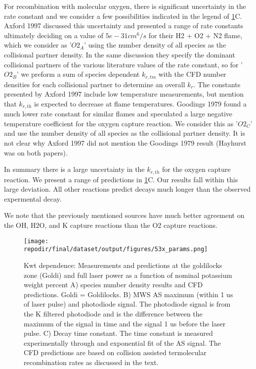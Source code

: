 For recombination with molecular oxygen, there is significant uncertainty in the rate constant and we consider a few possibilities indicated in the legend of \ref{fig:kwt_dependence}C. Axford 1997 discussed this uncertainty and presented a range of rate constants ultimately deciding on a value of $5e-31 cm^6/s$ for their H2 + O2 + N2 flame, which we consider as '$O2_A$' using the number density of all species as the collisional partner density. In the same discussion they specify the dominant collisional partners of the various literature values of the rate constant, so for '$O2_B$' we preform a sum of species dependent $k_{r,tm}$ with the CFD number densities for each collisional partner to determine an overall $k_r$. The constants presented by Axford 1997 include low temperature measurements, but mention that $k_{r,th}$ is expected to decrease at flame temperatures. Goodings 1979 found a much lower rate constant for similar flames and speculated a large negative temperature coefficient for the oxygen capture reaction. We consider this as '$O2_C$' and use the number density of all species as the collisional partner density. It is not clear why Axford 1997 did not mention the Goodings 1979 result (Hayhurst was on both papers). 

In summary there is a large uncertainty in the $k_{r,th}$ for the oxygen capture reaction. We present a range of predictions in \ref{fig:kwt_dependence}C. Our results fall within this large deviation. All other reactions predict decays much longer than the observed expermental decay. 

We note that the previously mentioned sources have much better agreement on the OH, H2O, and K capture reactions than the O2 capture reactions. 



\begin{figure}[h]
    \texttt{[image: \\repodir/final/dataset/output/figures/53x\_params.png]} 
    \caption{Kwt dependence: Measurements and predictions at the goldilocks zone (Goldi) and full laser power as a function of nominal potassium weight percent A) species number density results and CFD predictions. Goldi = Goldilocks. B) MWS AS maximum (within 1 us of laser pulse) and photodiode signal. The photodiode signal is from the K filtered photodiode and is the difference between the maximum of the signal in time and the signal 1 us before the laser pulse. C) Decay time constant. The time constant is measured experimentally through and exponential fit of the AS signal. The CFD predictions are based on collision assisted termolecular recombination rates as discussed in the text. }
    \label{fig:kwt_dependence}
\end{figure}

